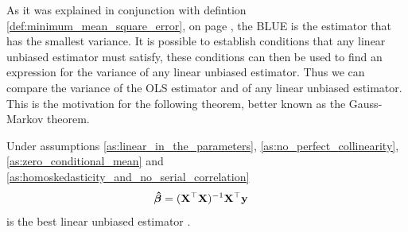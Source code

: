 As it was explained in conjunction with defintion \ref{def:minimum_mean_square_error}, on page \pageref{def:minimum_mean_square_error}, the BLUE is the estimator that has the smallest variance.
It is possible to establish conditions that any linear unbiased estimator must satisfy, these conditions can then be used to find an expression for the variance of any linear unbiased estimator.
Thus we can compare the variance of the OLS estimator and of any linear unbiased estimator.
This is the motivation for the following theorem, better known as the Gauss-Markov theorem.
\begin{theorem}
    Under assumptions \ref{as:linear_in_the_parameters}, \ref{as:no_perfect_collinearity}, \ref{as:zero_conditional_mean} and \ref{as:homoskedasticity_and_no_serial_correlation} 
    \begin{align}\label{eq:betahat_y}
        \operatorname{\boldsymbol{\hat{\beta}}} &= (\mathbf{X}^\top\mathbf{X})^{-1}\mathbf{X}^\top\mathbf{y}
    \end{align}
    is the best linear unbiased estimator \cite[p. 811]{Wooldridge2012}.
\end{theorem}\label{th:gauss_markoc_theorem}
